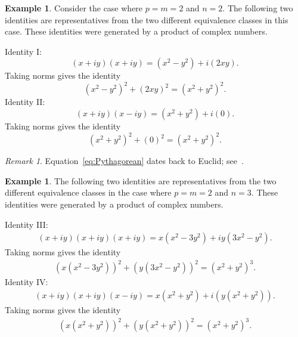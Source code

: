 \documentclass[12pt,table]{article}
\theoremstyle{definition}
\newtheorem{example}[theorem]{Example}
\theoremstyle{remark}
\newtheorem{remark}[theorem]{Remark}
\numberwithin{equation}{section}
\begin{document}
\begin{example}

Consider the case where $ p = m = 2 $ and $ n = 2$.
The following two identities are representatives from 
the two different equivalence classes in this case. These identities
were generated by a product of complex numbers. 

\noindent
Identity I:
\begin{equation*}
(x + iy)(x + iy) = (x^2 - y^2 ) + i(2xy).
\end{equation*}
Taking norms gives the identity
\begin{equation}
\label{eq:Pythagorean}
    (x^2 - y^2 )^2 + (2xy)^2 
    = (x^2 + y^2)^2.
\end{equation}
Identity II:
\begin{equation*}
    (x + iy )(x - iy )
    = (x^2 + y^2 ) + i(0).
\end{equation*}
Taking norms gives the identity
\begin{equation}
    (x^2 + y^2 )^2 + (0)^2
    = (x^2 + y^2 )^2.
\end{equation}
\end{example}

\begin{remark}
Equation~\eqref{eq:Pythagorean} dates back to Euclid; see~\cite{Euclid}. 
\end{remark}

\begin{example}
The following two identities are representatives from 
the two different equivalence classes in the
case where $ p = m = 2 $ and $ n = 3$.
These identities
were generated by a product of complex numbers. 

\noindent
Identity III:
\begin{align*}
    (x + iy)(x + iy)(x + iy) 
    = x(x^2 - 3y^2) + i  y(3x^2 - y^2)  . 
    \end{align*}
Taking norms gives the identity
    \begin{align}
    (x(x^2 - 3y^2))^2 + (  y(3x^2 - y^2) )^2  
    = (x^2 + y^2)^3.
    \end{align}
Identity IV:
    \begin{align*}
    (x + iy )(x + iy)(x - iy ) 
    = x(x^2 + y^2 ) + i(y(x^2 + y^2))  .
    \end{align*}
Taking norms gives the identity
    \begin{align}
    ( x(x^2 + y^2) )^2 + ( y(x^2 + y^2) )^2 
    = (x^2 + y^2 )^3.
    \end{align}
\end{example}
\end{document}
